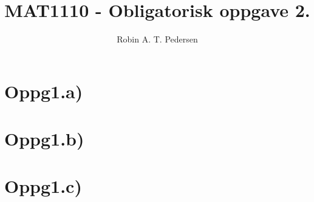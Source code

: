 \documentclass{article}
\begin{document}
  \title{MAT1110 - Obligatorisk oppgave 2.}
  \author{Robin A. T. Pedersen}
  \maketitle

  \section{Oppg1.a)}
    
  \section{Oppg1.b)}
    
  \section{Oppg1.c)}
    
\end{document}
